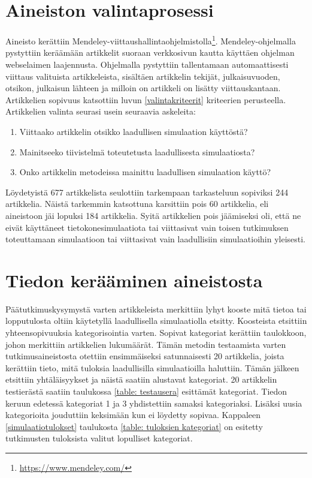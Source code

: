 \documentclass[utf8]{gradu3}
\begin{document}
\section{Aineiston valintaprosessi} \label{valintaprosessi}
Aineisto kerättiin Mendeley-viittaushallintaohjelmistolla\footnote{\url{https://www.mendeley.com/}}. Mendeley-ohjelmalla pystyttiin keräämään artikkelit suoraan verkkosivun kautta käyttäen ohjelman webselaimen laajennusta. Ohjelmalla pystyttiin tallentamaan automaattisesti viittaus valituista artikkeleista, sisältäen artikkelin tekijät, julkaisuvuoden, otsikon, julkaisun lähteen ja milloin on artikkeli on lisätty viittauskantaan. Artikkelien sopivuus katsottiin luvun \ref{valintakriteerit} kriteerien perusteella. Artikkelien valinta seurasi usein seuraavia askeleita:
\begin{comment}
    Käytännössä  sisäänlukukriteerit 1-4 toteutuvat tietokantahaussa.Vain kriteeri 5 jää tarkistettavaksi (ja sitä kautta myös poissulkukriteerit).
\end{comment}

\begin{enumerate}
    \item Viittaako artikkelin otsikko laadullisen simulaation käyttöstä?
    \item Mainitseeko tiivistelmä toteutetusta laadullisesta simulaatiosta?
    \item Onko artikkelin metodeissa mainittu laadullisen simulaation käyttö?
\end{enumerate}


Löydetyistä 677 artikkelista seulottiin tarkempaan tarkasteluun 
sopiviksi 244 artikkelia. 
Näistä tarkemmin katsottuna karsittiin pois 60 artikkelia, 
eli aineistoon jäi lopuksi 184 artikkelia. 
Syitä artikkelien pois jäämiseksi oli, 
että ne eivät käyttäneet tietokonesimulaatiota tai 
viittasivat vain toisen tutkimuksen toteuttamaan simulaatioon tai
viittasivat vain laadullisiin simulaatioihin yleisesti.


\section{Tiedon kerääminen aineistosta} \label{tiedon keruu}
Päätutkimuskysymystä varten artikkeleista merkittiin lyhyt kooste mitä tietoa tai lopputulosta oltiin käytetyllä laadullisella simulaatiolla etsitty. Koosteista etsittiin yhteensopivuuksia kategorisointia varten. Sopivat kategoriat kerättiin taulokkoon, johon merkittiin artikkelien lukumäärät. Tämän metodin testaamista varten tutkimusaineistosta otettiin ensimmäiseksi satunnaisesti 20 artikkelia, joista kerättiin tieto, mitä tuloksia laadullisilla simulaatioilla haluttiin. Tämän jälkeen etsittiin yhtäläisyykset ja näistä saatiin alustavat kategoriat. 20 artikkelin testierästä saatiin taulukossa \ref{table: testausera} esittämät kategoriat. Tiedon keruun edetessä kategoriat 1 ja 3 yhdistettiin samaksi kategoriaksi. Lisäksi uusia kategorioita jouduttiin keksimään kun ei löydetty sopivaa. Kappaleen \ref{simulaatiotulokset} taulukosta \ref{table: tuloksien kategoriat} on esitetty tutkimusten tuloksista valitut lopulliset kategoriat.
\end{document}
